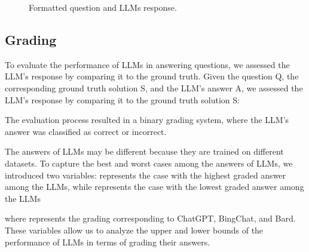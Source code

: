\documentclass[11pt]{article}
\begin{document}
\begin{figure*}[ht!]
	\begin{center}
\end{center}
	\caption{Formatted question and LLMs response.}
	\label{fig:chatbot_response}
\end{figure*}

\subsection{Grading}

To evaluate the performance of LLMs in answering questions, we assessed the LLM's response by comparing it to the ground truth. Given the question Q, the corresponding ground truth solution S, and the LLM's answer A, we assessed the LLM's response by comparing it to the ground truth solution S: 

The evaluation process resulted in a binary grading system, where the LLM's answer was classified as correct or incorrect.

The answers of LLMs may be different because they are trained on different datasets. To capture the best and worst cases among the answers of LLMs, we introduced two variables:  represents the case with the highest graded answer among the LLMs, while  represents the case with the lowest graded answer among the LLMs

where  represents the grading corresponding to ChatGPT, BingChat, and Bard. These variables allow us to analyze the upper and lower bounds of the performance of LLMs in terms of grading their answers.
\end{document}
